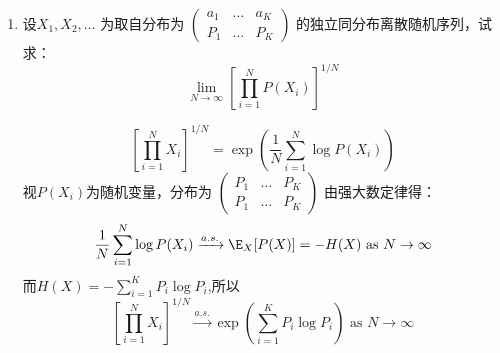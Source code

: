 \documentclass[a4paper]{article}
\begin{document}
\courseheader
{}
\begin{enumerate}[label=\thehwcnt.\arabic*.]
  \setlength{\itemsep}{3\parskip}

  \item 设$X_1,X_2,\dots$ 为取自分布为
$
\begin{pmatrix}
a_1 & \dots & a_K\\
P_1 & \dots & P_K
\end{pmatrix}
$
的独立同分布离散随机序列，试求：
$$
\lim_{N\to \infty}\left[\prod_{i=1}^N P(X_i)\right]^{1/N}
$$
\begin{solution}
$$
\left[\prod_{i=1}^N X_i\right]^{1/N}=\exp(\frac{1}{N}\sum_{i=1}^N \log P(X_i))
$$
视$P(X_i)$为随机变量，分布为
$
\begin{pmatrix}
P_1 & \dots & P_K\\
P_1 & \dots & P_K
\end{pmatrix}
$
由强大数定律得：
$$
\frac{1}{N}\sum_{i=1}^N \log P(X_i)\xrightarrow{a.s.} \E_{X}[P(X)]=-H(X) \text{ as } N \to \infty
$$
而$H(X)=-\sum_{i=1}^K P_i \log P_i$,所以
$$
\left[\prod_{i=1}^N X_i\right]^{1/N} \xrightarrow{a.s.} \exp\left(\sum_{i=1}^K P_i \log P_i\right)\text{ as } N \to \infty
$$


\end{solution}
\end{enumerate}
\end{document}
